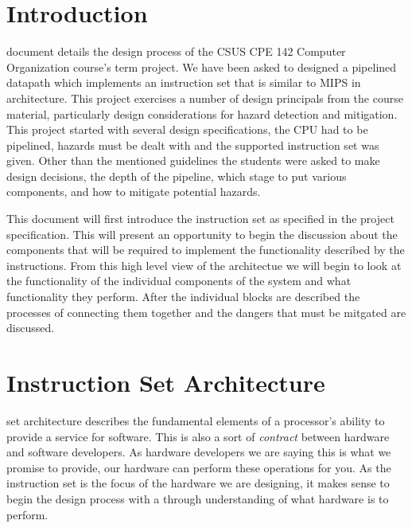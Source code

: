 
\usepackage{tabularx}
\usepackage{pdfpages}
\usepackage{lipsum}
\usepackage{pdfpages}

\renewcommand{\arraystretch}{1.3}

\newcommand{\COURSE}{CPE142: Computer Organization}
\newcommand{\TITLE}{Term Project: Phase Two}
\newcommand{\DUEDATE}{December Fourth 2014}
\newcommand{\ABSTRACT}{\textit{A pipelined CPU is designed to implement a subset of the MIPS instruction set...}}





%
%


\newpage

\newpage

\section{Introduction}
 document details the design process of the CSUS CPE 142 Computer Organization 
course's term project. We have been asked to designed a pipelined datapath which implements an instruction 
set that is similar to MIPS in architecture. This project exercises a number of design principals from
the course material, particularly design considerations for hazard detection and mitigation. This
project started with several design specifications, the CPU had to be pipelined, hazards must be dealt
with and the supported instruction set was given. Other than the mentioned guidelines the students were
asked to make design decisions, the depth of the pipeline, which stage to put various components, and how
to mitigate potential hazards.

This document will first introduce the instruction set as specified in the project specification. This will 
present an opportunity to begin the discussion about the components that will be required to implement the
functionality described by the instructions. From this high level view of the architectue we will begin to
look at the functionality of the individual components of the system and what functionality they perform. 
After the individual blocks are described the processes of connecting them together and the dangers that
must be mitgated are discussed. 

\section{Instruction Set Architecture}
 set architecture describes the fundamental elements of a processor's ability
to provide a service for software. This is also a sort of \textit{contract} between hardware and software
developers. As hardware developers we are saying this is what we promise to provide, our hardware can perform
these operations for you. As the instruction set is the focus of the hardware we are designing, it makes sense to
begin the design process with a through understanding of what hardware is to perform.

